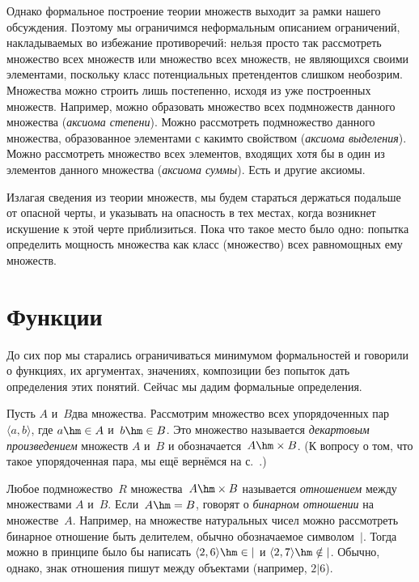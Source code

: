 Однако формальное построение теории множеств выходит за рамки
нашего обсуждения. Поэтому мы ограничимся неформальным описанием
ограничений, накладываемых во избежание противоречий: нельзя
просто так рассмотреть множество всех множеств или множество
всех множеств, не являющихся своими элементами, поскольку класс
потенциальных претендентов слишком  необозрим. Множества
можно строить лишь постепенно, исходя из уже построенных
множеств. Например, можно образовать множество всех подмножеств
данного множества (\emph{аксиома
степени}). Можно рассмотреть подмножество
данного множества, образованное элементами с каким\д то
свойством (\emph{аксиома выделения}).
Можно рассмотреть множество всех элементов, входящих хотя бы в
один из элементов данного множества (\emph{аксиома
суммы}). Есть и другие аксиомы.

Излагая сведения из теории множеств, мы будем стараться
держаться подальше от опасной черты, и указывать на опасность в
тех местах, когда возникнет искушение к этой черте приблизиться. Пока
что такое место было одно: попытка определить мощность%
 множества
как класс (множество) всех равномощных ему множеств.
\clearpage

\section{Функции}
        \label{functions}

До сих пор мы старались ограничиваться минимумом формальностей и
говорили о функциях, их аргументах,
значениях, композиции 
без попыток дать определения этих понятий. Сейчас мы дадим
формальные определения.

Пусть $A$ и~$B$\т два множества. Рассмотрим множество всех
упорядоченных пар
$\langle a,b\rangle$, где $a\hm\in A$
и~$b\hm\in B$. Это множество называется \emph{декартовым
произведением}%
 множеств $A$ и~$B$ и
обозначается~$A\hm\times B$.
(К вопросу о том, что такое упорядоченная пара, мы ещё вернёмся
на с.~\pageref{kuratowski-pair}.)

Любое подмножество~$R$ множества~$A\hm\times B$ называется
\emph{отношением} между множествами $A$ и~$B$. Если~$A\hm=B$,
говорят о \emph{бинарном отношении} на множестве~$A$.
Например, на множестве натуральных чисел можно рассмотреть
бинарное отношение  быть делителем, обычно обозначаемое
символом~$|$. Тогда можно в принципе было бы написать $\langle
2, 6\rangle\hm\in |$ и $\langle 2, 7\rangle\hm\notin |$. Обычно,
однако, знак отношения пишут между объектами (например, $2|6$).

